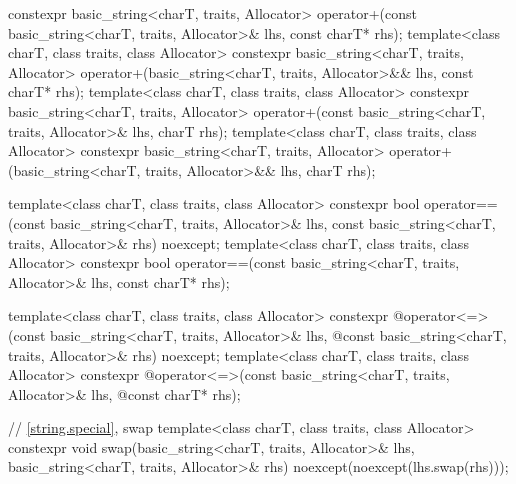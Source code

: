 \begin{codeblock}
{    constexpr basic_string<charT, traits, Allocator>
      operator+(const basic_string<charT, traits, Allocator>& lhs,
                const charT* rhs);
  template<class charT, class traits, class Allocator>
    constexpr basic_string<charT, traits, Allocator>
      operator+(basic_string<charT, traits, Allocator>&& lhs,
                const charT* rhs);
  template<class charT, class traits, class Allocator>
    constexpr basic_string<charT, traits, Allocator>
      operator+(const basic_string<charT, traits, Allocator>& lhs,
                charT rhs);
  template<class charT, class traits, class Allocator>
    constexpr basic_string<charT, traits, Allocator>
      operator+(basic_string<charT, traits, Allocator>&& lhs,
                charT rhs);

  template<class charT, class traits, class Allocator>
    constexpr bool
      operator==(const basic_string<charT, traits, Allocator>& lhs,
                 const basic_string<charT, traits, Allocator>& rhs) noexcept;
  template<class charT, class traits, class Allocator>
    constexpr bool operator==(const basic_string<charT, traits, Allocator>& lhs,
                              const charT* rhs);

  template<class charT, class traits, class Allocator>
    constexpr @\seebelow@ operator<=>(const basic_string<charT, traits, Allocator>& lhs,
              @\itcorr@                      const basic_string<charT, traits, Allocator>& rhs) noexcept;
  template<class charT, class traits, class Allocator>
    constexpr @\seebelow@ operator<=>(const basic_string<charT, traits, Allocator>& lhs,
              @\itcorr@                      const charT* rhs);

  // \ref{string.special}, swap
  template<class charT, class traits, class Allocator>
    constexpr void
      swap(basic_string<charT, traits, Allocator>& lhs,
           basic_string<charT, traits, Allocator>& rhs)
        noexcept(noexcept(lhs.swap(rhs)));

}
\end{codeblock}
